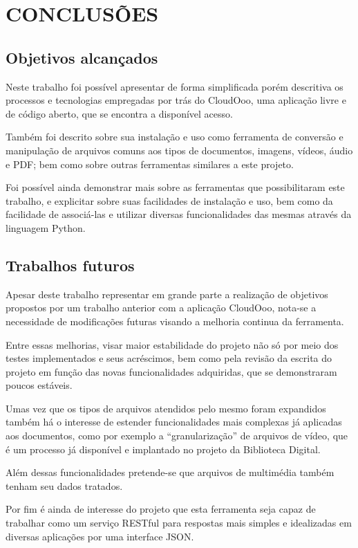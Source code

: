 \chapter{CONCLUSÕES}
\thispagestyle{empty}

\section{Objetivos alcançados}

Neste trabalho foi possível apresentar de forma simplificada porém descritiva os processos e tecnologias empregadas por trás do CloudOoo, uma aplicação livre e de código aberto, que se encontra a disponível acesso.

Também foi descrito sobre sua instalação e uso como ferramenta de conversão e manipulação de arquivos comuns aos tipos de documentos, imagens, vídeos, áudio e PDF; bem como sobre outras ferramentas similares a este projeto.

Foi possível ainda demonstrar mais sobre as ferramentas que possibilitaram este trabalho, e explicitar sobre suas facilidades de instalação e uso, bem como da facilidade de associá-las e utilizar diversas funcionalidades das mesmas através da linguagem Python.


\section{Trabalhos futuros}

Apesar deste trabalho representar em grande parte a realização de objetivos propostos por um trabalho anterior com a aplicação CloudOoo, nota-se a necessidade de modificações futuras visando a melhoria continua da ferramenta.

Entre essas melhorias, visar maior estabilidade do projeto não só por meio dos testes implementados e seus acréscimos, bem como pela revisão da escrita do projeto em função das novas funcionalidades adquiridas, que se demonstraram poucos estáveis.

Umas vez que os tipos de arquivos atendidos pelo mesmo foram expandidos também há o interesse de estender funcionalidades mais complexas já aplicadas aos documentos, como por exemplo a ``granularização'' de arquivos de vídeo, que é um processo já disponível e implantado no projeto da Biblioteca Digital.

Além dessas funcionalidades pretende-se que arquivos de multimédia também tenham seu dados tratados.

Por fim é ainda de interesse do projeto que esta ferramenta seja capaz de trabalhar como um serviço RESTful para respostas mais simples e  idealizadas em diversas aplicações por uma interface JSON.
